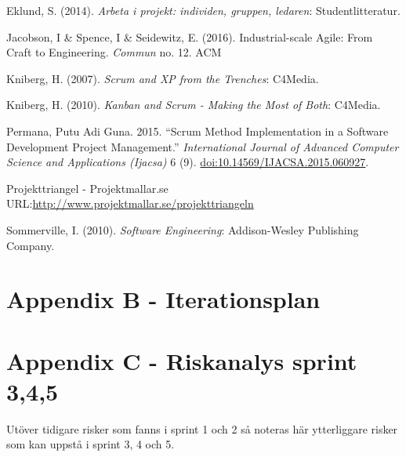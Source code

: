 \documentclass[11pt]{article}
\begin{document}
Eklund, S. (2014). \emph{Arbeta i projekt: individen, gruppen, ledaren}:
Studentlitteratur.

Jacobson, I \& Spence, I \& Seidewitz, E. (2016). Industrial-scale Agile: From Craft to Engineering. \emph{Commun} no. 12. ACM

Kniberg, H. (2007). \emph{Scrum and XP from the Trenches}: C4Media.

Kniberg, H. (2010). \emph{Kanban and Scrum - Making the Most of Both}: C4Media.

Permana, Putu Adi Guna. 2015. “Scrum Method Implementation in a Software
Development Project Management.” \emph{International Journal of Advanced
Computer Science and Applications (Ijacsa)} 6 (9).
\url{doi:10.14569/IJACSA.2015.060927}.

Projekttriangel - Projektmallar.se URL:\url{http://www.projektmallar.se/projekttriangeln}

Sommerville, I. (2010). \emph{Software Engineering}: Addison-Wesley Publishing Company.
\section{Appendix B - Iterationsplan}
\label{sec:org676073b}


\section{Appendix C - Riskanalys sprint 3,4,5}
\label{sec:orgbf68633}
Utöver tidigare risker som fanns i sprint 1 och 2 så noteras här ytterliggare risker som kan uppstå i sprint 3, 4 och 5.
\end{document}
